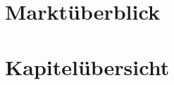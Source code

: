 \section{Marktüberblick} \label{sec:1-markt}


%

\section{Kapitelübersicht} \label{sec:1-kapitel}


